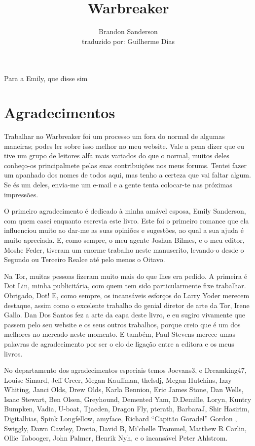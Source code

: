 \documentclass[11pt,a4paper]{book}
\author{Brandon Sanderson \\ traduzido por: Guilherme Dias}
\title{Warbreaker}
\begin{document}
\maketitle
\newpage
Para a Emily, que disse sim
\tableofcontents
\chapter{Agradecimentos}
Trabalhar no Warbreaker foi um processo um fora do normal de algumas maneiras; podes ler sobre isso melhor no meu website. Vale a pena dizer que eu tive um grupo de leitores alfa mais variados do que o normal, muitos deles conheço-os principalmete pelas suas contribuições nos meus forums. Tentei fazer um apanhado dos nomes de todos aqui, mas tenho a certeza que vai faltar algum. Se és um deles, envia-me um e-mail e a gente tenta colocar-te nas próximas impressões.

O primeiro agradecimento é dedicado à minha amável esposa, Emily Sanderson, com quem casei enquanto escrevia este livro. Este foi o primeiro romance que ela influenciou muito ao dar-me as suas opiniões e sugestões, ao qual  a sua ajuda é muito apreciada. E, como sempre, o meu agente Joshua Bilmes, e o meu editor, Moshe Feder, tiveram um enorme trabalho neste manuscrito, levando-o desde o Segundo ou Terceiro Realce até pelo menos o Oitavo.

Na Tor, muitas pessoas fizeram muito mais do que lhes era pedido. A primeira é Dot Lin, minha publicitária, com quem tem sido particularmente fixe trabalhar. Obrigado, Dot! E, como sempre, os incansáveis esforços do Larry Yoder merecem destaque, assim como o excelente trabalho do genial diretor de arte da Tor, Irene Gallo. Dan Dos Santos fez a arte da capa deste livro, e eu sugiro vivamente que passem pelo seu website e os seus outros trabalhos, porque creio que é um dos melhores no mercado neste momento. E também, Paul Stevens merece umas palavras de agradecimento por ser o elo de ligação entre a editora e os meus livros.

No departamento dos agradecimentos especiais temos Joevans3, e Dreamking47, Louise Simard, Jeff Creer, Megan Kauffman, thelsdj, Megan Hutchins, Izzy Whiting, Janci Olds, Drew Olds, Karla Bennion, Eric James Stone, Dan Wells, Isaac Stewart, Ben Olsen, Greyhound, Demented Yam, D.Demille, Loryn, Kuntry Bumpken, Vadia, U-boat, Tjaeden, Dragon Fly, pterath, BarbaraJ, Shir Hasirim, Digitalbias, Spink Longfellow, amyface, Richard “Capitão Goradel” Gordon , Swiggly, Dawn Cawley, Drerio, David B, Mi’chelle Trammel, Matthew R Carlin, Ollie Tabooger, John Palmer, Henrik Nyh, e o incansável Peter Ahlstrom.
\end{document}
